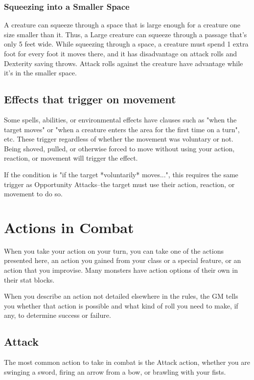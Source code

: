 \subsubsection{Squeezing into a Smaller Space}

A creature can squeeze through a space that is large enough for a creature one size smaller than it. Thus, a Large creature can squeeze through a passage that's only 5 feet wide. While squeezing through a space, a creature must spend 1 extra foot for every foot it moves there, and it has disadvantage on attack rolls and Dexterity saving throws. Attack rolls against the creature have advantage while it's in the smaller space.

\subsection{Effects that trigger on movement}
Some spells, abilities, or environmental effects have clauses such as "when the target moves" or "when a creature enters the area for the first time on a turn", etc. These trigger regardless of whether the movement was voluntary or not. Being shoved, pulled, or otherwise forced to move without using your action, reaction, or movement will trigger the effect.

If the condition is "if the target *voluntarily* moves...", this requires the same trigger as Opportunity Attacks--the target must use their action, reaction, or movement to do so.

\section{Actions in Combat}

When you take your action on your turn, you can take one of the actions presented here, an action you gained from your class or a special feature, or an action that you improvise. Many monsters have action options of their own in their stat blocks.

When you describe an action not detailed elsewhere in the rules, the GM tells you whether that action is possible and what kind of roll you need to make, if any, to determine success or failure.

\subsection{Attack}

The most common action to take in combat is the Attack action, whether you are swinging a sword, firing an arrow from a bow, or brawling with your fists.

